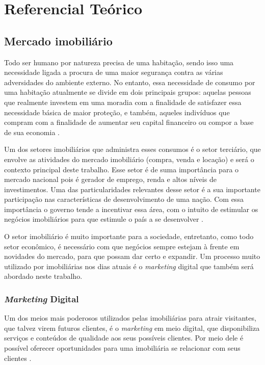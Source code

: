 \chapter{Referencial Teórico}

\section{Mercado imobiliário}

Todo ser humano por natureza precisa de uma habitação, sendo isso uma necessidade ligada a procura de uma maior segurança contra as várias adversidades do ambiente externo. No entanto, essa necessidade de consumo por uma habitação atualmente se divide em dois principais grupos: aquelas pessoas que realmente investem em uma moradia com a finalidade de satisfazer essa necessidade básica de maior proteção, e também, aqueles indivíduos que compram com a finalidade de aumentar seu capital financeiro ou compor a base de sua economia \cite{Arraes:2008}.

Um dos setores imobiliários que administra esses consumos é o setor terciário, que envolve as atividades do mercado imobiliário (compra, venda e locação) e será o contexto principal deste trabalho. Esse setor é de suma importância para o mercado nacional pois é gerador de emprego, renda e altos níveis de investimentos. Uma das particularidades relevantes desse setor é a sua importante participação nas características de desenvolvimento de uma nação. Com essa importância o governo tende a incentivar essa área, com o intuito de estimular os negócios imobiliários para que estimule o país a se desenvolver \cite{Correa:2018}.

O setor imobiliário é muito importante para a sociedade, entretanto, como todo setor econômico, é necessário com que negócios sempre estejam à frente em novidades do mercado, para que possam dar certo e expandir. Um processo muito utilizado por imobiliárias nos dias atuais é o \textit{marketing} digital que também será abordado neste trabalho.

\subsection{\textit{Marketing} Digital}

Um dos meios mais poderosos utilizados pelas imobiliárias para atrair visitantes, que talvez virem futuros clientes, é o \textit{marketing} em meio digital, que disponibiliza serviços e conteúdos de qualidade aos seus possíveis clientes. Por meio dele é possível oferecer oportunidades para uma imobiliária se relacionar com seus clientes \cite{Barreto:2019}.

